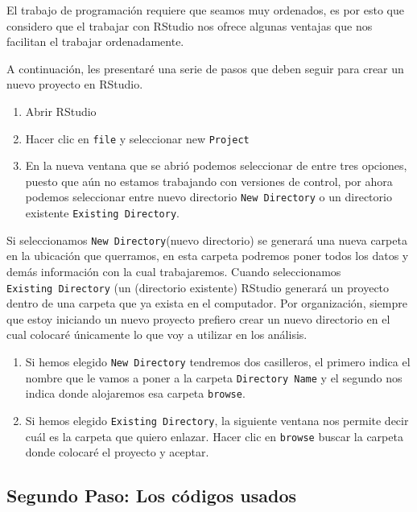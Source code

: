 \documentclass[]{article}
\providecommand{\tightlist}{%
  \setlength{\itemsep}{0pt}\setlength{\parskip}{0pt}}
\begin{document}
El trabajo de programación requiere que seamos muy ordenados, es por
esto que considero que el trabajar con RStudio nos ofrece algunas
ventajas que nos facilitan el trabajar ordenadamente.

A continuación, les presentaré una serie de pasos que deben seguir para
crear un nuevo proyecto en RStudio.

\begin{enumerate}
\def\labelenumi{\arabic{enumi}.}
\tightlist
\item
  Abrir RStudio
\item
  Hacer clic en \texttt{file} y seleccionar new \texttt{Project}
\item
  En la nueva ventana que se abrió podemos seleccionar de entre tres
  opciones, puesto que aún no estamos trabajando con versiones de
  control, por ahora podemos seleccionar entre nuevo directorio
  \texttt{New\ Directory} o un directorio existente
  \texttt{Existing\ Directory}.
\end{enumerate}

Si seleccionamos \texttt{New\ Directory}(nuevo directorio) se generará
una nueva carpeta en la ubicación que querramos, en esta carpeta
podremos poner todos los datos y demás información con la cual
trabajaremos. Cuando seleccionamos \texttt{Existing\ Directory} (un
(directorio existente) RStudio generará un proyecto dentro de una
carpeta que ya exista en el computador. Por organización, siempre que
estoy iniciando un nuevo proyecto prefiero crear un nuevo directorio en
el cual colocaré únicamente lo que voy a utilizar en los análisis.

\begin{enumerate}
\def\labelenumi{\arabic{enumi}.}
\setcounter{enumi}{3}
\item
  Si hemos elegido \texttt{New\ Directory} tendremos dos casilleros, el
  primero indica el nombre que le vamos a poner a la carpeta
  \texttt{Directory\ Name} y el segundo nos indica donde alojaremos esa
  carpeta \texttt{browse}.
\item
  Si hemos elegido \texttt{Existing\ Directory}, la siguiente ventana
  nos permite decir cuál es la carpeta que quiero enlazar. Hacer clic en
  \texttt{browse} buscar la carpeta donde colocaré el proyecto y
  aceptar.
\end{enumerate}

\subsection{Segundo Paso: Los códigos
usados}\label{segundo-paso-los-codigos-usados}
\end{document}
